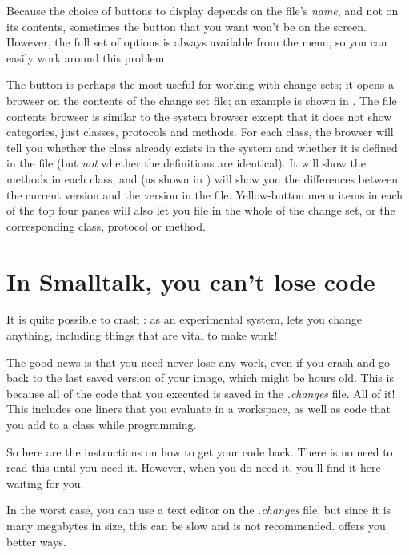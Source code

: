 \documentclass[a4paper,10pt,twoside]{book}
\begin{document}
Because the choice of buttons to display depends on the file's \emph{name}, and not on its contents, sometimes the button that you want won't be on the screen.  
However, the full set of options is always available from the   menu, so
you can easily work around this problem.

The  button is perhaps the most useful for working with change sets; it opens a browser on the contents of the change set file; an example is shown in .
The file contents browser is similar to the system browser except that it does not show categories, just classes, protocols and methods.
For each class, the browser will tell you whether the class already exists in the system and whether it is defined in the file (but \emph{not} whether the definitions are identical).  
It will show the methods in each class, and (as shown in ) will show you the differences between the current version and the version in the file.
Yellow-button menu items in each of the top four panes will also let you file in the whole of the change set, or the corresponding class, protocol or method. 

\section{In Smalltalk, you can't lose code}
\label{sec:cantLoseCode} %

It is quite possible to crash \sq: as an experimental system, \sq lets you change anything, including things that are vital to make \sq work! 


The good news is that you need never lose any work, even if you crash and go back to the last saved version of your image, which might be hours old.
This is because all of the code that you executed is saved in the \emph{.changes} file.
All of it!
This includes one liners that you evaluate in a workspace, as well as code that you add to a class while programming.

So here are the instructions on how to get your code back.
There is no need to read this until you need it. 
However, when you do need it, you'll find it here waiting for you.

In the worst case, you can use a text editor on the \emph{.changes} file, but since it is many megabytes in size, this can be slow and is not recommended. 
\sq offers you better ways.
\end{document}
